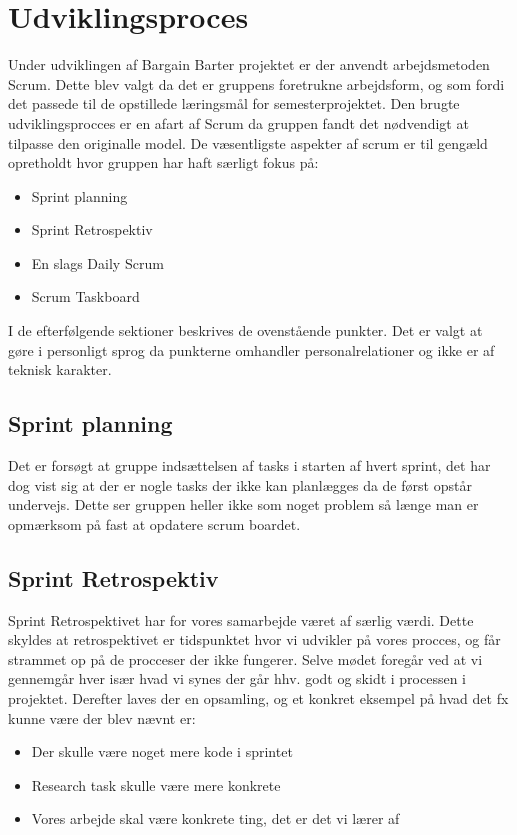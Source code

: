 \chapter{Udviklingsproces}

Under udviklingen af Bargain Barter projektet er der anvendt arbejdsmetoden Scrum. Dette blev valgt da det er gruppens foretrukne arbejdsform, og som fordi det passede til de opstillede læringsmål for semesterprojektet. Den brugte udviklingsprocces er en afart af Scrum da gruppen fandt det nødvendigt at tilpasse den originalle model. De væsentligste aspekter af scrum er til gengæld opretholdt hvor gruppen har haft særligt fokus på:

\begin{itemize}
		\item Sprint planning
		\item Sprint Retrospektiv
		\item En slags Daily Scrum
		\item Scrum Taskboard
	\end{itemize}

I de efterfølgende sektioner beskrives de ovenstående punkter. Det er valgt at gøre i personligt sprog da punkterne omhandler personalrelationer og ikke er af teknisk karakter. 

\section{Sprint planning}
Det er forsøgt at gruppe indsættelsen af tasks i starten af hvert sprint, det har dog vist sig at der er nogle tasks der ikke kan planlægges da de først opstår undervejs. Dette ser gruppen heller ikke som noget problem så længe man er opmærksom på fast at opdatere scrum boardet.  


\section{Sprint Retrospektiv}
Sprint Retrospektivet har for vores samarbejde været af særlig værdi. Dette skyldes at retrospektivet er tidspunktet hvor vi udvikler på vores procces, og får strammet op på de procceser der ikke fungerer. Selve mødet foregår ved at vi gennemgår hver især hvad vi synes der går hhv. godt og skidt i processen i projektet. Derefter laves der en opsamling, og et konkret eksempel på hvad det fx kunne være der blev nævnt er:

\begin{itemize}
	\item Der skulle være noget mere kode  i sprintet
	\item Research task skulle være mere konkrete
	\item Vores arbejde skal være konkrete ting, det er det vi lærer af
\end{itemize}

